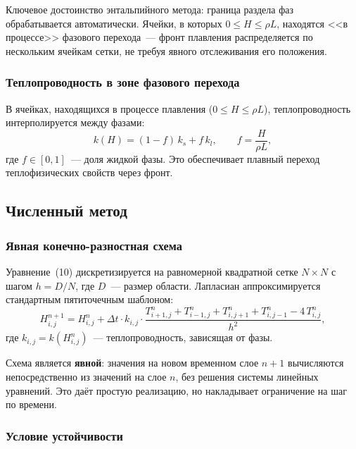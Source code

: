 Ключевое достоинство энтальпийного метода: граница раздела фаз
обрабатывается автоматически. Ячейки, в которых $0 \le H \le \rho L$,
находятся <<в процессе>> фазового перехода~--- фронт плавления
распределяется по нескольким ячейкам сетки, не требуя явного
отслеживания его положения.

\subsubsection{Теплопроводность в зоне фазового перехода}

В ячейках, находящихся в процессе плавления ($0 \le H \le \rho L$),
теплопроводность интерполируется между фазами:
\begin{equation}
  k(H) = (1 - f)\,k_s + f\,k_l, \qquad f = \frac{H}{\rho L},
\end{equation}
где $f \in [0,1]$~--- доля жидкой фазы. Это обеспечивает плавный
переход теплофизических свойств через фронт.

\subsection{Численный метод}

\subsubsection{Явная конечно-разностная схема}

Уравнение~(10) дискретизируется на равномерной
квадратной сетке $N \times N$ с шагом $h = D / N$, где $D$~--- размер
области. Лапласиан аппроксимируется стандартным пятиточечным шаблоном:
\begin{equation}\label{eq:scheme}
  H_{i,j}^{n+1} = H_{i,j}^{n}
    + \Delta t \cdot k_{i,j}
    \cdot \frac{T_{i+1,j}^n + T_{i-1,j}^n + T_{i,j+1}^n + T_{i,j-1}^n
          - 4\,T_{i,j}^n}{h^2},
\end{equation}
где $k_{i,j} = k(H_{i,j}^n)$~--- теплопроводность, зависящая от фазы.

Схема является \textbf{явной}: значения на новом временном слое $n+1$
вычисляются непосредственно из значений на слое $n$, без решения
системы линейных уравнений. Это даёт простую реализацию, но накладывает
ограничение на шаг по времени.

\subsubsection{Условие устойчивости}

